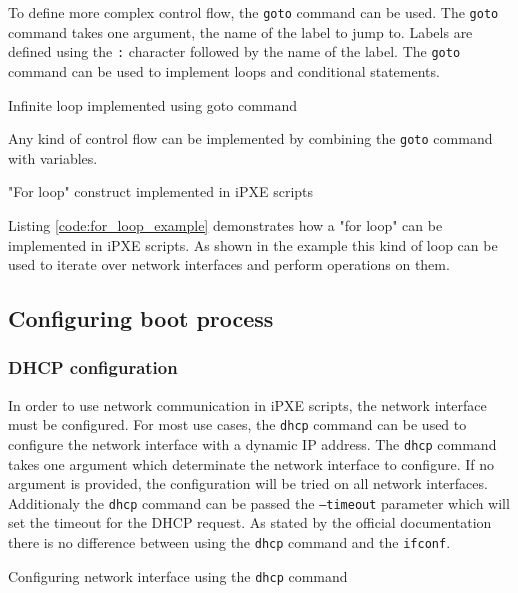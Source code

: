 \documentclass[../main.tex]{subfiles}
\begin{document}
To define more complex control flow, the \texttt{goto} command can be used.
The \texttt{goto} command takes one argument, the name of the label to jump to.
Labels are defined using the \texttt{:} character followed by the name of the label.
The \texttt{goto} command can be used to implement loops and conditional statements.

\begin{listing}[H]
  \caption{Infinite loop implemented using goto command}
\end{listing}

Any kind of control flow can be implemented by combining the \texttt{goto} command with variables.

\begin{listing}[H]
  \caption{"For loop" construct implemented in iPXE scripts}
  \label{code:for_loop_example}
\end{listing}

Listing \ref{code:for_loop_example} demonstrates how a "for loop" can be implemented in iPXE scripts. As shown in the example this kind of loop can be used to
iterate over network interfaces and perform operations on them.

\subsection{Configuring boot process}

\subsubsection{DHCP configuration}

In order to use network communication in iPXE scripts, the network interface must be configured.
For most use cases, the \texttt{dhcp} command can be used to configure the network interface with a dynamic IP address.
The \texttt{dhcp} command takes one argument which determinate the network interface to configure.
If no argument is provided, the configuration will be tried on all network interfaces.
Additionaly the \texttt{dhcp} command can be passed the \texttt{--timeout} parameter which will set the timeout for the DHCP request.
As stated by the official documentation \cite{ipxe_dhcp_vs_ifconfig} there is no difference between using the \texttt{dhcp} command and the \texttt{ifconf}.

\begin{listing}[H]
  \caption{Configuring network interface using the \texttt{dhcp} command}
  \label{code:dhcp_configuration}
\end{listing}
\end{document}
